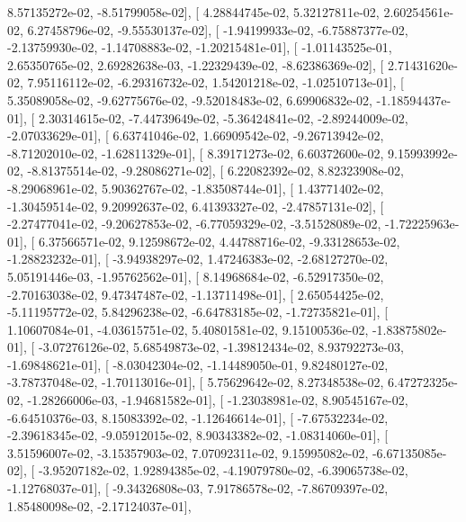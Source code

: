 \documentclass{article}
\begin{document}
          8.57135272e-02,  -8.51799058e-02],
       [  4.28844745e-02,   5.32127811e-02,   2.60254561e-02,
          6.27458796e-02,  -9.55530137e-02],
       [ -1.94199933e-02,  -6.75887377e-02,  -2.13759930e-02,
         -1.14708883e-02,  -1.20215481e-01],
       [ -1.01143525e-01,   2.65350765e-02,   2.69282638e-03,
         -1.22329439e-02,  -8.62386369e-02],
       [  2.71431620e-02,   7.95116112e-02,  -6.29316732e-02,
          1.54201218e-02,  -1.02510713e-01],
       [  5.35089058e-02,  -9.62775676e-02,  -9.52018483e-02,
          6.69906832e-02,  -1.18594437e-01],
       [  2.30314615e-02,  -7.44739649e-02,  -5.36424841e-02,
         -2.89244009e-02,  -2.07033629e-01],
       [  6.63741046e-02,   1.66909542e-02,  -9.26713942e-02,
         -8.71202010e-02,  -1.62811329e-01],
       [  8.39171273e-02,   6.60372600e-02,   9.15993992e-02,
         -8.81375514e-02,  -9.28086271e-02],
       [  6.22082392e-02,   8.82323908e-02,  -8.29068961e-02,
          5.90362767e-02,  -1.83508744e-01],
       [  1.43771402e-02,  -1.30459514e-02,   9.20992637e-02,
          6.41393327e-02,  -2.47857131e-02],
       [ -2.27477041e-02,  -9.20627853e-02,  -6.77059329e-02,
         -3.51528089e-02,  -1.72225963e-01],
       [  6.37566571e-02,   9.12598672e-02,   4.44788716e-02,
         -9.33128653e-02,  -1.28823232e-01],
       [ -3.94938297e-02,   1.47246383e-02,  -2.68127270e-02,
          5.05191446e-03,  -1.95762562e-01],
       [  8.14968684e-02,  -6.52917350e-02,  -2.70163038e-02,
          9.47347487e-02,  -1.13711498e-01],
       [  2.65054425e-02,  -5.11195772e-02,   5.84296238e-02,
         -6.64783185e-02,  -1.72735821e-01],
       [  1.10607084e-01,  -4.03615751e-02,   5.40801581e-02,
          9.15100536e-02,  -1.83875802e-01],
       [ -3.07276126e-02,   5.68549873e-02,  -1.39812434e-02,
          8.93792273e-03,  -1.69848621e-01],
       [ -8.03042304e-02,  -1.14489050e-01,   9.82480127e-02,
         -3.78737048e-02,  -1.70113016e-01],
       [  5.75629642e-02,   8.27348538e-02,   6.47272325e-02,
         -1.28266006e-03,  -1.94681582e-01],
       [ -1.23038981e-02,   8.90545167e-02,  -6.64510376e-03,
          8.15083392e-02,  -1.12646614e-01],
       [ -7.67532234e-02,  -2.39618345e-02,  -9.05912015e-02,
          8.90343382e-02,  -1.08314060e-01],
       [  3.51596007e-02,  -3.15357903e-02,   7.07092311e-02,
          9.15995082e-02,  -6.67135085e-02],
       [ -3.95207182e-02,   1.92894385e-02,  -4.19079780e-02,
         -6.39065738e-02,  -1.12768037e-01],
       [ -9.34326808e-03,   7.91786578e-02,  -7.86709397e-02,
          1.85480098e-02,  -2.17124037e-01],
\end{document}
